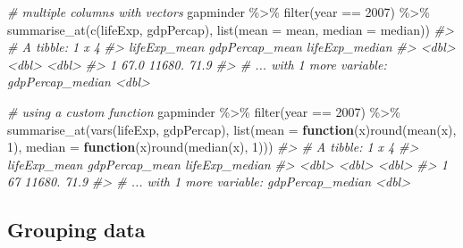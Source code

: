 \documentclass[
]{book}
\newenvironment{Shaded}{\begin{snugshade}}{\end{snugshade}}
\newcommand{\AttributeTok}[1]{\textcolor[rgb]{0.77,0.63,0.00}{#1}}
\newcommand{\CommentTok}[1]{\textcolor[rgb]{0.56,0.35,0.01}{\textit{#1}}}
\newcommand{\ControlFlowTok}[1]{\textcolor[rgb]{0.13,0.29,0.53}{\textbf{#1}}}
\newcommand{\DecValTok}[1]{\textcolor[rgb]{0.00,0.00,0.81}{#1}}
\newcommand{\FunctionTok}[1]{\textcolor[rgb]{0.00,0.00,0.00}{#1}}
\newcommand{\NormalTok}[1]{#1}
\newcommand{\SpecialCharTok}[1]{\textcolor[rgb]{0.00,0.00,0.00}{#1}}
\newcommand{\StringTok}[1]{\textcolor[rgb]{0.31,0.60,0.02}{#1}}
\begin{document}
\begin{Shaded}
\begin{Highlighting}[]
\CommentTok{\# multiple columns with vectors}
\NormalTok{gapminder }\SpecialCharTok{\%\textgreater{}\%}
  \FunctionTok{filter}\NormalTok{(year }\SpecialCharTok{==} \DecValTok{2007}\NormalTok{) }\SpecialCharTok{\%\textgreater{}\%}
  \FunctionTok{summarise\_at}\NormalTok{(}\FunctionTok{c}\NormalTok{(}\StringTok{\textquotesingle{}lifeExp\textquotesingle{}}\NormalTok{, }\StringTok{\textquotesingle{}gdpPercap\textquotesingle{}}\NormalTok{), }\FunctionTok{list}\NormalTok{(}\AttributeTok{mean =}\NormalTok{ mean, }\AttributeTok{median =}\NormalTok{ median))}
\CommentTok{\#\textgreater{} \# A tibble: 1 x 4}
\CommentTok{\#\textgreater{}   lifeExp\_mean gdpPercap\_mean lifeExp\_median}
\CommentTok{\#\textgreater{}          \textless{}dbl\textgreater{}          \textless{}dbl\textgreater{}          \textless{}dbl\textgreater{}}
\CommentTok{\#\textgreater{} 1         67.0         11680.           71.9}
\CommentTok{\#\textgreater{} \# ... with 1 more variable: gdpPercap\_median \textless{}dbl\textgreater{}}

\CommentTok{\# using a custom function}
\NormalTok{gapminder }\SpecialCharTok{\%\textgreater{}\%}
  \FunctionTok{filter}\NormalTok{(year }\SpecialCharTok{==} \DecValTok{2007}\NormalTok{) }\SpecialCharTok{\%\textgreater{}\%}
  \FunctionTok{summarise\_at}\NormalTok{(}\FunctionTok{vars}\NormalTok{(lifeExp, gdpPercap), }\FunctionTok{list}\NormalTok{(}\AttributeTok{mean =} \ControlFlowTok{function}\NormalTok{(x)}\FunctionTok{round}\NormalTok{(}\FunctionTok{mean}\NormalTok{(x), }\DecValTok{1}\NormalTok{), }
                                              \AttributeTok{median =} \ControlFlowTok{function}\NormalTok{(x)}\FunctionTok{round}\NormalTok{(}\FunctionTok{median}\NormalTok{(x), }\DecValTok{1}\NormalTok{)))  }
\CommentTok{\#\textgreater{} \# A tibble: 1 x 4}
\CommentTok{\#\textgreater{}   lifeExp\_mean gdpPercap\_mean lifeExp\_median}
\CommentTok{\#\textgreater{}          \textless{}dbl\textgreater{}          \textless{}dbl\textgreater{}          \textless{}dbl\textgreater{}}
\CommentTok{\#\textgreater{} 1           67         11680.           71.9}
\CommentTok{\#\textgreater{} \# ... with 1 more variable: gdpPercap\_median \textless{}dbl\textgreater{}}
\end{Highlighting}
\end{Shaded}

\hypertarget{grouping-data}{%
\subsection{Grouping data}\label{grouping-data}}
\end{document}
